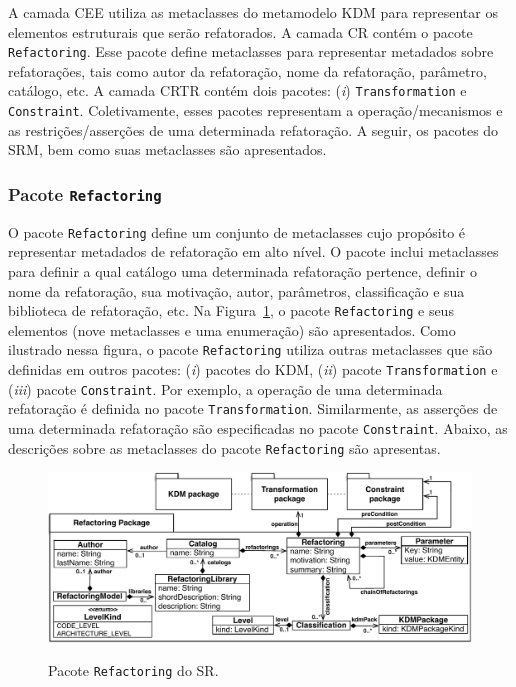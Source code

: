 A camada CEE utiliza as metaclasses do metamodelo KDM para representar os elementos estruturais que serão refatorados. A camada CR contém o pacote \texttt{Refactoring}. Esse pacote define metaclasses para representar metadados sobre refatorações, tais como autor da refatoração, nome da refatoração, parâmetro, catálogo, etc. A camada CRTR contém dois pacotes: (\textit{i})  \texttt{Transformation} e \texttt{Constraint}. Coletivamente, esses pacotes representam a operação/mecanismos e as restrições/asserções de uma determinada refatoração. A seguir, os pacotes do SRM, bem como suas metaclasses são apresentados.

\subsubsection{Pacote \texttt{Refactoring}}

O pacote \texttt{Refactoring} define um conjunto de metaclasses cujo propósito é representar metadados de refatoração em alto nível. O pacote inclui metaclasses para definir a qual catálogo uma determinada refatoração pertence, definir o nome da refatoração, sua motivação, autor, parâmetros, classificação e sua biblioteca de refatoração, etc. Na Figura~\ref{fig:pacote_refactoring_srm}, o pacote \texttt{Refactoring} e seus elementos (nove metaclasses e uma enumeração) são apresentados. Como ilustrado nessa figura, o pacote \texttt{Refactoring} utiliza outras metaclasses que são definidas em outros pacotes: (\textit{i}) pacotes do KDM, (\textit{ii}) pacote \texttt{Transformation} e (\textit{iii}) pacote \texttt{Constraint}. Por exemplo, a operação de uma determinada refatoração é definida no pacote \texttt{Transformation}. Similarmente, as asserções de uma determinada refatoração são especificadas no pacote \texttt{Constraint}. Abaixo, as descrições sobre as metaclasses do pacote \texttt{Refactoring} são apresentas. 

\begin{figure}[h]
	\centering
		\caption{Pacote \texttt{Refactoring} do SR.}
	\includegraphics[scale=0.70]{images/pacoteRefactoring2}
	\label{fig:pacote_refactoring_srm}
	\fautor
\end{figure}

